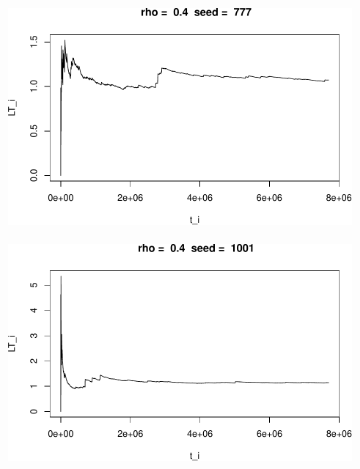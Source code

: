 \documentclass[]{article}
\begin{document}
\begin{figure}[h!]
\begin{subfigure}[b]{.55\linewidth}
\includegraphics[width=\linewidth]{003_files/figure-latex/unnamed-chunk-13-7.pdf}
\end{subfigure}\hfill
\begin{subfigure}[b]{.55\linewidth}
\includegraphics[width=\linewidth]{003_files/figure-latex/unnamed-chunk-13-8.pdf}
\end{subfigure}\vfill
\end{figure}
\end{document}
